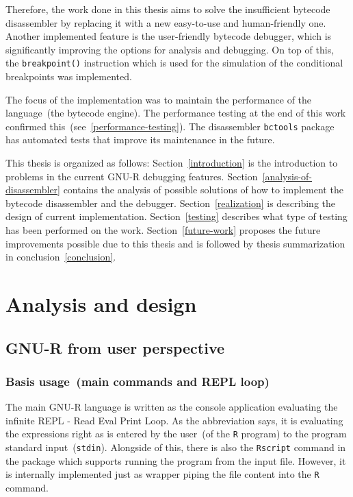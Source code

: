\documentclass[thesis=M,english]{FITthesis}[2018/10/20]
\newcommand{\code}[1]{\texttt{#1}}
\begin{document}
Therefore, the work done in this thesis aims to solve the insufficient bytecode disassembler by replacing it with a new easy-to-use and human-friendly one. Another implemented feature is the user-friendly bytecode debugger, which is significantly improving the options for analysis and debugging. On top of this, the \code{breakpoint()} instruction which is used for the simulation of the conditional breakpoints was implemented. 

The focus of the implementation was to maintain the performance of the language~(the bytecode engine). The performance testing at the end of this work confirmed this~(see~\ref{performance-testing}). The disassembler \code{bctools} package has automated tests that improve its maintenance in the future. 

This thesis is organized as follows: Section~\ref{introduction} is the introduction to problems in the current GNU-R debugging features. Section~\ref{analysis-of-disassembler} contains the analysis of possible solutions of how to implement the bytecode disassembler and the debugger. Section~\ref{realization} is describing the design of current implementation. Section~\ref{testing} describes what type of testing has been performed on the work. Section~\ref{future-work} proposes the future improvements possible due to this thesis and is followed by thesis summarization in conclusion~\ref{conclusion}.


\chapter{Analysis and design}

\section{GNU-R from user perspective}\label{R-UI}

\subsection{Basis usage~(main commands and REPL loop)}\label{REPL}

The main GNU-R language is written as the console application evaluating the infinite REPL - Read Eval Print Loop. As the abbreviation says, it is evaluating the expressions right as is entered by the user~(of the \code{R} program) to the program standard input~(\code{stdin}). Alongside of this, there is also the \code{Rscript} command in the package which supports running the program from the input file. However, it is internally implemented just as wrapper piping the file content into the \code{R} command.
\end{document}

